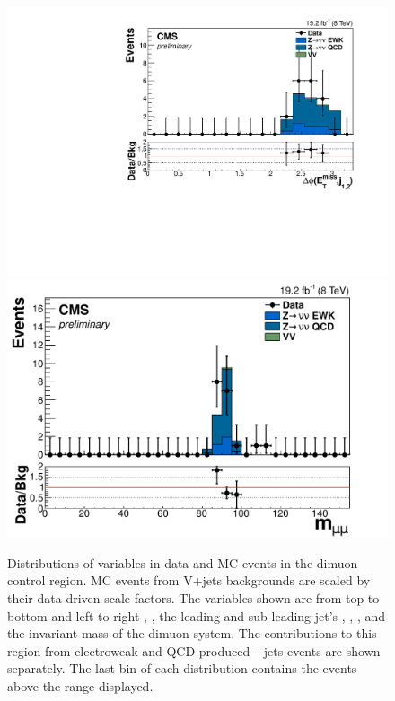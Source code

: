 \begin{figure}
  \includegraphics[width=.65\largefigwidth]{plots/parked/HIG-14-038-figs/output_sigreg/mumu_jetmetnomu_mindphi.pdf}
  \includegraphics[width=.65\largefigwidth]{plots/parked/HIG-14-038-figs/output_sigreg/mumu_m_mumu.pdf}
  \caption{Distributions of variables in data and \ac{MC} events in the dimuon control region. \ac{MC} events from V+jets backgrounds are scaled by their data-driven scale factors. The variables shown are from top to bottom and left to right \detajj, \Mjj, the leading and sub-leading jet's \pt, \METnoMU, \METsig, \jetmetdphileading and the invariant mass of the dimuon system. The contributions to this region from electroweak and \ac{QCD} produced \PZ+jets events are shown separately. The last bin of each distribution contains the events above the range displayed.}
  \label{fig:parkedznunu}
\end{figure}

